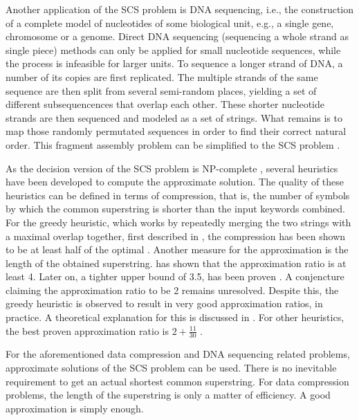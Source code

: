\documentclass[english,twoside,censored,csm,algorithms-track-2020]{HYthesisML}
\theoremstyle{plain}
\theoremstyle{definition}
\begin{document}
Another application of the SCS problem is DNA sequencing, i.e., the construction of a complete
model of nucleotides of some biological unit, e.g., a single gene, chromosome or a genome. 
Direct DNA sequencing (sequencing a whole strand as single piece) methods can only be applied for
small nucleotide sequences,
while the process is infeasible for larger units. To sequence a longer strand of DNA,
a number of its copies are
first replicated. The multiple strands of the same sequence are then split from several semi-random
places, yielding a set of different subsequencences that overlap each other. These shorter nucleotide
strands are then sequenced and modeled as a set of strings. What remains is to map
those randomly permutated sequences in order to find their correct natural order.
This fragment assembly problem can be simplified to the SCS problem \citep{Peltola83}.

As the decision version of the SCS problem is \textsc{NP}-complete \citep{Gallant80},
several heuristics have been
developed to compute the approximate solution.
The quality of these heuristics
can be defined in terms of compression, that is, the number of symbols by which the common superstring
is shorter than the input keywords combined. For the greedy heuristic,
which works by repeatedly merging the two strings with a maximal overlap together, first
described in \citep{Gallant82}, the compression has been shown to be at least half of the optimal
\citep{Tarhio88}. Another measure for the approximation is the length of the
obtained superstring. \citep{Blum94} has shown that the approximation ratio is at least 4.
Later on, a tighter upper bound of 3.5, has been proven \citep{Kaplan05}.
A conjencture \citep{Tarhio88} claiming the approximation ratio to be 2 remains unresolved.
Despite this,
the greedy heuristic is observed to result in very good approximation
ratios, in practice. A theoretical explanation for this is discussed in \citep{Ma08}.
For other heuristics,
the best proven approximation ratio is $2 + \frac{11}{30}$ \citep{Paluch14}.

For the aforementioned data compression and DNA sequencing related problems,
approximate solutions of the SCS problem can be used. There is no inevitable requirement
to get an actual shortest common superstring. For data compression problems, the length of
the superstring is only a matter of efficiency. A good approximation is simply enough. 
\end{document}
